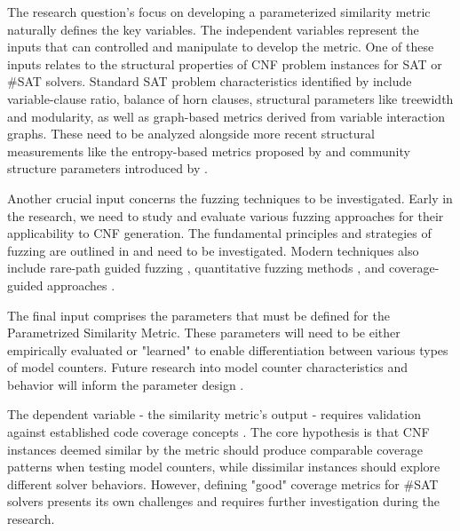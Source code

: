 \documentclass[english, a4paper]{article}
\begin{document}
The research question's focus on developing a parameterized similarity metric naturally defines the key variables. The independent variables represent the inputs that can controlled and manipulate to develop the metric. One of these inputs relates to the structural properties of CNF problem instances for SAT or \#SAT solvers. Standard SAT problem characteristics identified by \textcite{xuSATzillaPortfoliobasedAlgorithm2008} include variable-clause ratio, balance of horn clauses, structural parameters like treewidth and modularity, as well as graph-based metrics derived from variable interaction graphs. These need to be analyzed alongside more recent structural measurements like the entropy-based metrics proposed by \textcite{zhangStructuralEntropyMeasurement2021} and community structure parameters introduced by \textcite{ganianNewWidthParameters2021}.

Another crucial input concerns the fuzzing techniques to be investigated. Early in the research, we need to study and evaluate various fuzzing approaches for their applicability to CNF generation. The fundamental principles and strategies of fuzzing are outlined in \textcite{Zeller2024, Zeller2023} and need to be investigated. Modern techniques also include rare-path guided fuzzing \parencite{sahaRarePathGuided2023}, quantitative fuzzing methods \parencite{nollerQFuzzQuantitativeFuzzing2021}, and coverage-guided approaches \parencite{bohmeEstimatingResidualRisk2021}.

The final input comprises the parameters that must be defined for the Parametrized Similarity Metric. These parameters will need to be either empirically evaluated or "learned" to enable differentiation between various types of model counters. Future research into model counter characteristics and behavior will inform the parameter design \parencite{dudekDPMCWeightedModel2020, dudekADDMCWeightedModel2020, dudekParallelWeightedModel2021, fichteProofsPropositionalModel2022}.

The dependent variable - the similarity metric's output - requires validation against established code coverage concepts \parencite{Zeller2024, Zeller2023}. The core hypothesis is that CNF instances deemed similar by the metric should produce comparable coverage patterns when testing model counters, while dissimilar instances should explore different solver behaviors. However, defining "good" coverage metrics for \#SAT solvers presents its own challenges \parencite{usmanTestMCTestingModel2020, carvalhoSpecBCFuzzFuzzingLTL2024} and requires further investigation during the research.
\end{document}
